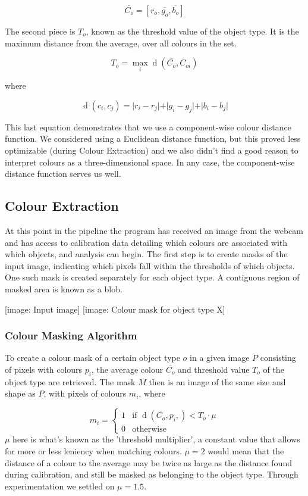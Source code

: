 \documentclass[10pt,twocolumn]{scrartcl}
\DeclareMathOperator{\dist}{d}
\begin{document}
\[
\overline{C_o} = [ \overline{r_o},\overline{g_o},\overline{b_o} ]
\]

The second piece is $T_o$, known as the threshold value of the object type. It is the maximum distance from the average, over all colours in the set.

\[
T_o = \max_{i} \dist( \overline{C_o}, C_{oi} )
\]

where

\[
\dist(c_i,c_j) = \vert r_{i}-r_{j} \vert + \vert g_{i}-g_{j} \vert + \vert b_{i}-b_{j} \vert 
\]

This last equation demonstrates that we use a component-wise colour distance function. We considered using a Euclidean distance function, but this proved less optimizable (during Colour Extraction) and we also didn't find a good reason to interpret colours as a three-dimensional space. In any case, the component-wise distance function serves us well.

\subsection{Colour Extraction}
At this point in the pipeline the program has received an image from the webcam and has access to calibration data detailing which colours are associated with which objects, and analysis can begin. The first step is to create masks of the input image, indicating which pixels fall within the thresholds of which objects. One such mask is created separately for each object type. A contiguous region of masked area is known as a blob.

[image: Input image] [image: Colour mask for object type X]

\subsubsection{Colour Masking Algorithm}
To create a colour mask of a certain object type $o$ in a given image $P$ consisting of pixels with colours $p_i$, the average colour $\overline{C_o}$ and threshold value $T_o$ of the object type are retrieved. The mask $M$ then is an image of the same size and shape as $P$, with pixels of colours $m_i$, where

\[
m_i =
	\begin{cases}
	1 & \mbox{if } \dist( \overline{C_o}, p_i, ) < T_o \cdot \mu \\
	0 & \mbox{otherwise}
	\end{cases}
\]
$\mu$ here is what's known as the 'threshold multiplier', a constant value that allows for more or less leniency when matching colours. $\mu = 2$ would mean that the distance of a colour to the average may be twice as large as the distance found during calibration, and still be masked as belonging to the object type. Through experimentation we settled on $\mu = 1.5$.
\end{document}
